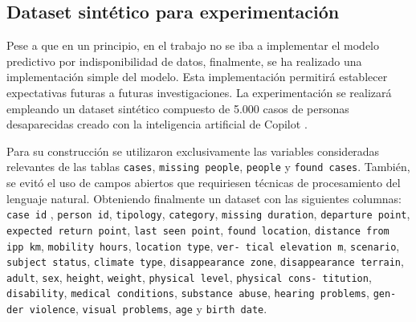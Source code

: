 

\subsection{Dataset sintético para experimentación}
Pese a que en un principio, en el trabajo no se iba a implementar el modelo predictivo por indisponibilidad de datos, finalmente, se ha realizado una implementación simple del modelo. Esta implementación permitirá establecer expectativas futuras a futuras investigaciones. La experimentación se realizará empleando un dataset sintético compuesto de 5.000 casos de personas desaparecidas creado con la inteligencia artificial de Copilot \cite{copilot2025}.

Para su construcción se utilizaron exclusivamente las variables consideradas relevantes de las tablas \texttt{cases}, \texttt{missing people}, \texttt{people} y \texttt{found cases}. También, se evitó el uso de campos abiertos que requiriesen técnicas de procesamiento del lenguaje natural. Obteniendo finalmente un dataset con las siguientes columnas: \texttt{case id} , \texttt{person id}, \texttt{tipology}, \texttt{category}, \texttt{missing duration}, \texttt{departure point}, \texttt{expected return point}, \texttt{last seen point}, \texttt{found location}, \texttt{distance from ipp km}, \texttt{mobility hours}, \texttt{location type}, \texttt{ver- tical elevation m}, \texttt{scenario}, \texttt{subject status}, \texttt{climate type}, \texttt{disappearance zone}, \texttt{disappearance terrain}, \texttt{adult}, \texttt{sex}, \texttt{height}, \texttt{weight}, \texttt{physical level}, \texttt{physical cons- titution}, \texttt{disability}, \texttt{medical conditions}, \texttt{substance abuse}, \texttt{hearing problems}, \texttt{gen- der violence}, \texttt{visual problems}, \texttt{age} y \texttt{birth date}.

